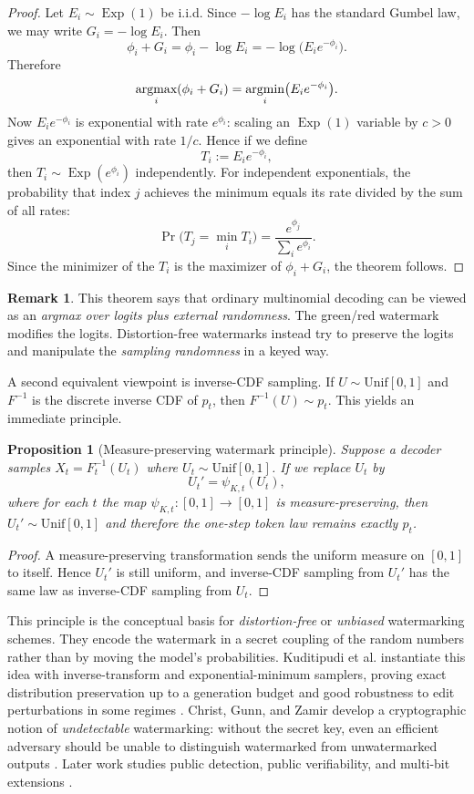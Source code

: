\documentclass[11pt]{article}
\newtheorem{proposition}[theorem]{Proposition}
\theoremstyle{definition}
\newtheorem{remark}[theorem]{Remark}
\DeclareMathOperator{\Exp}{Exp}
\newcommand{\PrK}{\Pr}
\newcommand{\1}{\mathbf{1}}
\begin{document}
\begin{proof}
Let $E_i\sim \Exp(1)$ be i.i.d. Since $-\log E_i$ has the standard Gumbel law, we may write $G_i=-\log E_i$. Then
\[
\phi_i + G_i = \phi_i - \log E_i = -\log\bigl(E_i e^{-\phi_i}\bigr).
\]
Therefore
\[
\mathop{\mbox{{\rm argmax}}}\limits_i (\phi_i+G_i) = \mathop{\mbox{{\rm argmin}}}\limits_i \bigl(E_i e^{-\phi_i}\bigr).
\]
Now $E_i e^{-\phi_i}$ is exponential with rate $e^{\phi_i}$: scaling an $\Exp(1)$ variable by $c>0$ gives an exponential with rate $1/c$. Hence if we define
\[
T_i := E_i e^{-\phi_i},
\]
then $T_i\sim \Exp(e^{\phi_i})$ independently. For independent exponentials, the probability that index $j$ achieves the minimum equals its rate divided by the sum of all rates:
\[
\PrK\bigl(T_j = \min_i T_i\bigr)=\frac{e^{\phi_j}}{\sum_i e^{\phi_i}}.
\]
Since the minimizer of the $T_i$ is the maximizer of $\phi_i+G_i$, the theorem follows.
\end{proof}

\begin{remark}
This theorem says that ordinary multinomial decoding can be viewed as an \emph{argmax over logits plus external randomness}. The green/red watermark modifies the logits. Distortion-free watermarks instead try to preserve the logits and manipulate the \emph{sampling randomness} in a keyed way.
\end{remark}

A second equivalent viewpoint is inverse-CDF sampling. If $U\sim \mathrm{Unif}[0,1]$ and $F^{-1}$ is the discrete inverse CDF of $p_t$, then $F^{-1}(U)\sim p_t$. This yields an immediate principle.

\begin{proposition}[Measure-preserving watermark principle]
Suppose a decoder samples $X_t = F_t^{-1}(U_t)$ where $U_t\sim \mathrm{Unif}[0,1]$. If we replace $U_t$ by
\[
U_t' = \psi_{K,t}(U_t),
\]
where for each $t$ the map $\psi_{K,t}:[0,1]\to[0,1]$ is measure-preserving, then $U_t'\sim\mathrm{Unif}[0,1]$ and therefore the one-step token law remains exactly $p_t$.
\end{proposition}

\begin{proof}
A measure-preserving transformation sends the uniform measure on $[0,1]$ to itself. Hence $U_t'$ is still uniform, and inverse-CDF sampling from $U_t'$ has the same law as inverse-CDF sampling from $U_t$.
\end{proof}

This principle is the conceptual basis for \emph{distortion-free} or \emph{unbiased} watermarking schemes. They encode the watermark in a secret coupling of the random numbers rather than by moving the model's probabilities. Kuditipudi et al. instantiate this idea with inverse-transform and exponential-minimum samplers, proving exact distribution preservation up to a generation budget and good robustness to edit perturbations in some regimes \cite{kuditipudi2024distortionfree}. Christ, Gunn, and Zamir develop a cryptographic notion of \emph{undetectable} watermarking: without the secret key, even an efficient adversary should be unable to distinguish watermarked from unwatermarked outputs \cite{christ2024undetectable}. Later work studies public detection, public verifiability, and multi-bit extensions \cite{fairoze2024public,liu2024upv,qu2024multibit}.
\end{document}
